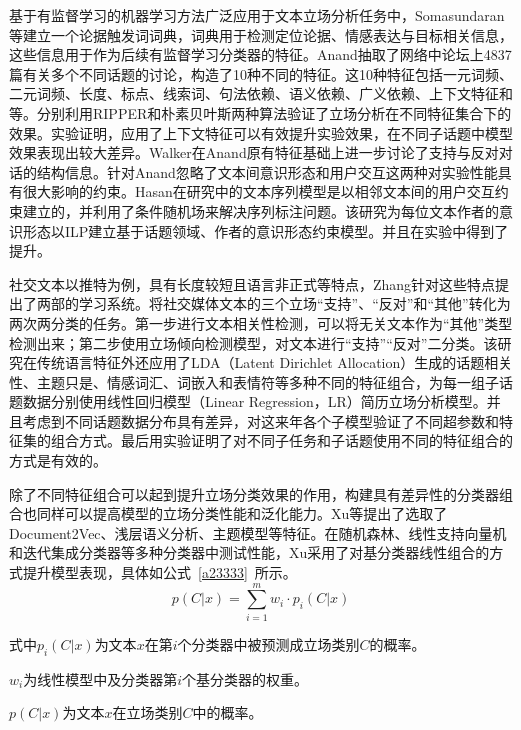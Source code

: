 
基于有监督学习的机器学习方法广泛应用于文本立场分析任务中，Somasundaran等建立一个论据触发词词典，词典用于检测定位论据、情感表达与目标相关信息，这些信息用于作为后续有监督学习分类器的特征。Anand抽取了网络中论坛上4837篇有关多个不同话题的讨论，构造了10种不同的特征。这10种特征包括一元词频、二元词频、长度、标点、线索词、句法依赖、语义依赖、广义依赖、上下文特征和等。分别利用RIPPER和朴素贝叶斯两种算法验证了立场分析在不同特征集合下的效果。实验证明，应用了上下文特征可以有效提升实验效果，在不同子话题中模型效果表现出较大差异。Walker在Anand原有特征基础上进一步讨论了支持与反对对话的结构信息。针对Anand忽略了文本间意识形态和用户交互这两种对实验性能具有很大影响的约束。Hasan在研究中的文本序列模型是以相邻文本间的用户交互约束建立的，并利用了条件随机场来解决序列标注问题。该研究为每位文本作者的意识形态以ILP建立基于话题领域、作者的意识形态约束模型。并且在实验中得到了提升。

社交文本以推特为例，具有长度较短且语言非正式等特点，Zhang针对这些特点提出了两部的学习系统。将社交媒体文本的三个立场“支持”、“反对”和“其他”转化为两次两分类的任务。第一步进行文本相关性检测，可以将无关文本作为“其他”类型检测出来；第二步使用立场倾向检测模型，对文本进行“支持”“反对”二分类。该研究在传统语言特征外还应用了LDA（Latent Dirichlet Allocation）生成的话题相关性、主题只是、情感词汇、词嵌入和表情符等多种不同的特征组合，为每一组子话题数据分别使用线性回归模型（Linear Regression，LR）简历立场分析模型。并且考虑到不同话题数据分布具有差异，对这来年各个子模型验证了不同超参数和特征集的组合方式。最后用实验证明了对不同子任务和子话题使用不同的特征组合的方式是有效的。

除了不同特征组合可以起到提升立场分类效果的作用，构建具有差异性的分类器组合也同样可以提高模型的立场分类性能和泛化能力。Xu等提出了选取了Document2Vec、浅层语义分析、主题模型等特征。在随机森林、线性支持向量机和迭代集成分类器等多种分类器中测试性能，Xu采用了对基分类器线性组合的方式提升模型表现，具体如公式~\ref{a23333}~所示。
\begin{equation}\label{a23333}
p(C|x)=\sum_{i=1}^m w_i \cdot p_i(C|x)
\end{equation}

式中$p_i(C|x)$为文本$x$在第$i$个分类器中被预测成立场类别$C$的概率。

$w_i$为线性模型中及分类器第$i$个基分类器的权重。

$p(C|x)$为文本$x$在立场类别$C$中的概率。

